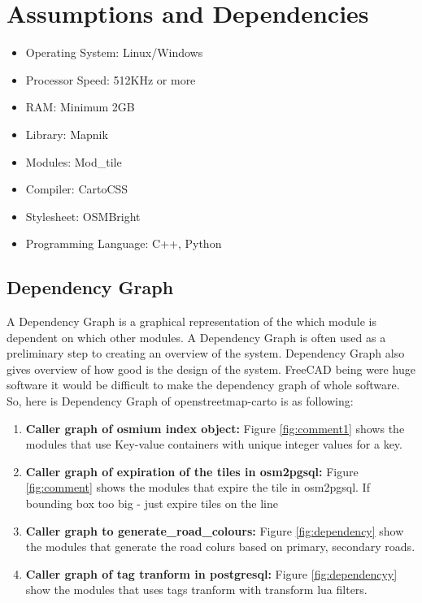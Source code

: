\section{Assumptions and Dependencies}
\begin{itemize}
	\item Operating System: Linux/Windows
	\item Processor Speed: 512KHz or more
	\item RAM: Minimum 2GB
	\item Library: Mapnik
	\item Modules: Mod\_tile
	\item Compiler: CartoCSS
	\item Stylesheet: OSMBright
	\item Programming Language: C++, Python
\end{itemize}

\subsection{Dependency Graph}
A Dependency Graph is a graphical representation of the which module is dependent on which other modules. A Dependency Graph is often used as a preliminary step to creating an overview of the system. Dependency Graph also gives overview of how good is the design of the system.
FreeCAD being were huge software it would be difficult to make the dependency graph of whole software. So, here is  Dependency Graph of openstreetmap-carto is as following:
\begin{enumerate}
\item \textbf{Caller graph of osmium index object:} Figure \ref{fig:comment1} shows the modules that use Key-value containers with unique integer values for a key.
\item \textbf{Caller graph of expiration of the tiles in osm2pgsql:} Figure \ref{fig:comment} shows the modules that expire the tile in osm2pgsql. If bounding box too big - just expire tiles on the line
\item \textbf{Caller graph to generate\_road\_colours:} Figure \ref{fig:dependency} show the modules that generate the road colurs based on primary, secondary roads.
\item \textbf{Caller graph of tag tranform in postgresql:} Figure \ref{fig:dependencyy} show the modules that uses tags tranform with transform lua filters.
\end{enumerate}

